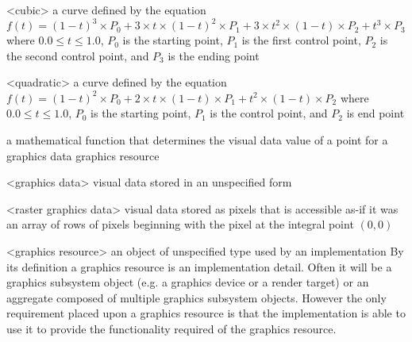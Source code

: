 %
%
<cubic> a curve defined by the 
equation $f(t) = (1 - t)^{3} \times P_{0} + 3 \times t \times (1 - t)^{2} 
\times P_{1} + 3 \times t^{2} \times (1 - t) \times P_{2} + t^{3} \times P_{3}$ 
where $0.0 \le t \le 1.0$, $P_{0}$ is the starting point, $P_{1}$ is the first 
control point, $P_{2}$ is the second control point, and $P_{3}$ is the 
ending point

<quadratic> a curve defined by the 
equation $f(t) = (1 - t)^{2} \times P_{0} + 2 \times t \times (1 - t) 
\times P_{1} + t^{2} \times (1 - t) \times P_{2}$ 
where $0.0 \le t \le 1.0$, $P_{0}$ is the starting point, $P_{1}$ is the 
control point, and $P_{2}$ is end point

a mathematical function that determines the visual data value of a point for a graphics data graphics resource

<graphics data> visual data stored in an unspecified form

<raster graphics data> visual data stored as pixels that is accessible as-if it was an array of rows of pixels beginning with the pixel at the integral point $(0,0)$

<graphics resource> an object of unspecified type used by an implementation
\enternote
By its definition a graphics resource is an implementation detail. Often it will be a graphics subsystem object (e.g. a graphics device or a render target) or an aggregate composed of multiple graphics subsystem objects. However the only requirement placed upon a graphics resource is that the implementation is able to use it to provide the functionality required of the graphics resource.
\exitnote

